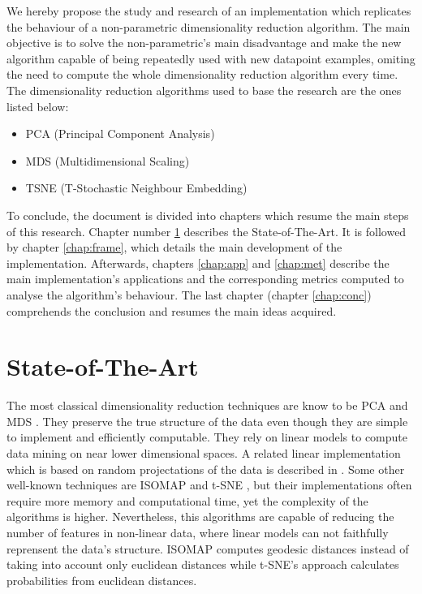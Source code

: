 \documentclass[a4paper,11pt,spanish]{report}
\begin{document}
We hereby propose the study and research of an implementation which replicates the behaviour of a non-parametric dimensionality reduction algorithm. The main objective is to solve the non-parametric's main disadvantage and make the new algorithm capable of being repeatedly used with new datapoint examples, omiting the need to compute the whole dimensionality reduction algorithm every time.\\
The dimensionality reduction algorithms used to base the research are the ones listed below:
\renewcommand{\labelitemi}{\textendash}
\begin{itemize}
\item PCA (Principal Component Analysis)
\item MDS (Multidimensional Scaling)
\item TSNE (T-Stochastic Neighbour Embedding)
\end{itemize}

To conclude, the document is divided into chapters which resume the main steps of this research. Chapter number \ref{chap:stt} describes the State-of-The-Art. It is followed by chapter \ref{chap:frame}, which details the main development of the implementation. Afterwards, chapters \ref{chap:app} and \ref{chap:met} describe the main implementation's applications and the corresponding metrics computed to analyse the algorithm's behaviour. The last chapter (chapter \ref{chap:conc}) comprehends the conclusion and resumes the main ideas acquired.


\chapter{State-of-The-Art}
\label{chap:stt}

The most classical dimensionality reduction techniques are know to be PCA \citep{pca} and MDS \citep{mds}. They preserve the true structure of the data even though they are simple to implement and efficiently computable. They rely on linear models to compute data mining on near lower dimensional spaces. A related linear implementation which is based on random projectations of the data is described in \citep{rproj, rproj2}. Some other well-known techniques are ISOMAP \citep{isomap} and t-SNE \citep{tsne}, but their implementations often require more memory and computational time, yet the complexity of the algorithms is higher. Nevertheless, this algorithms are capable of reducing the number of features in non-linear data, where linear models can not faithfully reprensent the data's structure. ISOMAP computes geodesic distances instead of taking into account only euclidean distances while t-SNE's approach calculates probabilities from euclidean distances.
\end{document}
